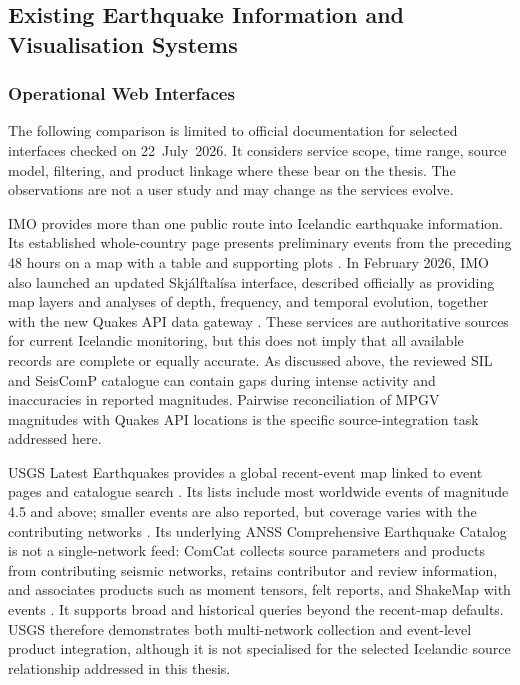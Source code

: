 \documentclass[12pt]{article}
\begin{document}
\subsection{Existing Earthquake Information and Visualisation Systems}

\subsubsection{Operational Web Interfaces}

The following comparison is limited to official documentation for selected interfaces checked on 22~July~2026. It considers service scope, time range, source model, filtering, and product linkage where these bear on the thesis. The observations are not a user study and may change as the services evolve.

IMO provides more than one public route into Icelandic earthquake information. Its established whole-country page presents preliminary events from the preceding 48 hours on a map with a table and supporting plots \cite{imo_quakes_48h}. In February 2026, IMO also launched an updated Skj\'alftal\'isa interface, described officially as providing map layers and analyses of depth, frequency, and temporal evolution, together with the new Quakes API data gateway \cite{imo_seiscomp_2026}. These services are authoritative sources for current Icelandic monitoring, but this does not imply that all available records are complete or equally accurate. As discussed above, the reviewed SIL and SeisComP catalogue can contain gaps during intense activity and inaccuracies in reported magnitudes. Pairwise reconciliation of MPGV magnitudes with Quakes API locations is the specific source-integration task addressed here.

USGS Latest Earthquakes provides a global recent-event map linked to event pages and catalogue search \cite{usgs_latest_map}. Its lists include most worldwide events of magnitude 4.5 and above; smaller events are also reported, but coverage varies with the contributing networks \cite{usgs_latest_help}. Its underlying ANSS Comprehensive Earthquake Catalog is not a single-network feed: ComCat collects source parameters and products from contributing seismic networks, retains contributor and review information, and associates products such as moment tensors, felt reports, and ShakeMap with events \cite{usgs_comcat}. It supports broad and historical queries beyond the recent-map defaults. USGS therefore demonstrates both multi-network collection and event-level product integration, although it is not specialised for the selected Icelandic source relationship addressed in this thesis.
\end{document}
